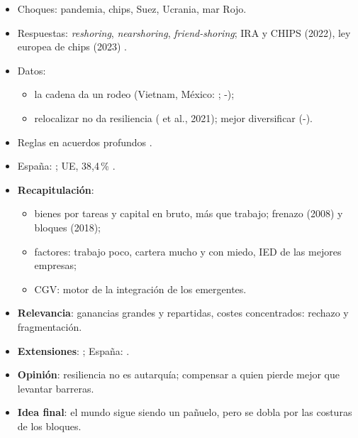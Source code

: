 \documentclass{article}
\begin{document}
\begin{columnas}
\begin{itemize}
\item Choques: pandemia, chips, Suez, Ucrania, mar Rojo.
\item Respuestas: \emph{reshoring}, \emph{nearshoring}, \emph{friend-shoring}; IRA y CHIPS (2022), ley europea de chips (2023) .
\item Datos:
  \begin{itemize}
  \item la cadena da un rodeo (Vietnam, México: ; -);
  \item relocalizar no da resiliencia ( et al., 2021); mejor diversificar (-).
  \end{itemize}
\item Reglas en acuerdos profundos .
\item España: ; UE, 38,4\,\% .
\end{itemize}

\begin{itemize}
\item \textbf{Recapitulación}:
  \begin{itemize}
  \item bienes por tareas y capital en bruto, más que trabajo; frenazo (2008) y bloques (2018);
  \item factores: trabajo poco, cartera mucho y con miedo, IED de las mejores empresas;
  \item CGV: motor de la integración de los emergentes.
  \end{itemize}
\item \textbf{Relevancia}: ganancias grandes y repartidas, costes concentrados: rechazo y fragmentación.
\item \textbf{Extensiones}:     ; España:   .
\item \textbf{Opinión}: resiliencia no es autarquía; compensar a quien pierde mejor que levantar barreras.
\item \textbf{Idea final}: el mundo sigue siendo un pañuelo, pero se dobla por las costuras de los bloques.
\end{itemize}


\end{columnas}
\end{document}
